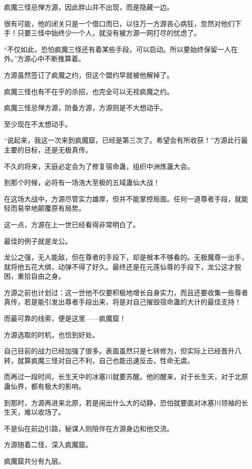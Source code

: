 \begin{this_body}
疯魔三怪忌惮方源，因此胖山并不出现，而是隐藏一边。

很有可能，他的闭关只是一个借口而已，以往万一方源丧心病狂，忽然对他们下手！只要三怪中始终少一个人，就没有被方源一网打尽的忧虑了。

“不仅如此，恐怕疯魔三怪还有着某些手段，可以启动。所以要始终保留一人在外。”方源心中不断推算着。

方源虽然签订了疯魔之约，但这个盟约早就被他解掉了。

疯魔三怪也有不在乎的杀招，也完全可以无视疯魔之约。

疯魔三怪忌惮方源，防备方源，方源则是不大想动手。

至少现在不太想动手。

“说起来，我这一次来到疯魔窟，已经是第三次了。希望会有所收获！”方源此行最主要的目标，还是无极真传。

不久的将来，天庭必定会为了修复宿命蛊，组织中洲炼蛊大会。

到那个时候，必将有一场浩大至极的五域蛊仙大战！

在这场大战中，方源尽管实力雄厚，但并不能掌控局面。任何一道尊者手段，就能轻而易举地颠覆原有局势。

这一点，方源在上一世已经看得非常明白了。

最佳的例子就是龙公。

龙公之强，无人能敌，但在尊者的手段下，却是根本不够看的。无极魔尊一出手，就将他五花大绑，动弹不得了好久。最终还是在元莲仙尊的手段下，龙公这才脱困，重拾自由之身。

方源之前也计划过：这一世他不仅要积极地增长自身实力，而且还要收集一些尊者真传，若是能引发出尊者手段出来，将是对自己摧毁宿命蛊的大计的最佳支持！

而最可靠的线索，便是这里——疯魔窟！

方源选取的时机，也恰到好处。

自己目前的战力已经加强了很多。表面虽然只是七转修为，但实际上已经晋升八转，就算疯魔三怪对自己不利，自己也能迅速反击，性命无虞。

而再过一段时间，长生天中的冰塞川就要苏醒。他的醒来，对于长生天，对于北原蛊仙界，都有极大的影响。

到那时，方源再进来北原，若是闹出什么大的动静，恐怕就要面对冰塞川领袖的长生天，难以收场了。

不是仙在前边引路，秘谋人则陪伴在方源身边和他交流。

方源随着二怪，深入疯魔窟。

疯魔窟共分有九层。


\end{this_body}
